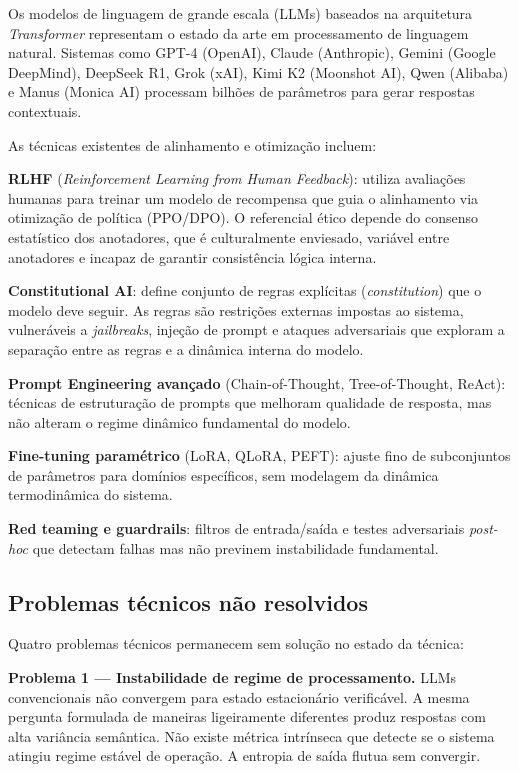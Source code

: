 \documentclass[12pt,a4paper]{article}
\begin{document}
Os modelos de linguagem de grande escala (LLMs) baseados na
arquitetura \textit{Transformer} representam o estado da arte em
processamento de linguagem natural. Sistemas como GPT-4 (OpenAI),
Claude (Anthropic), Gemini (Google DeepMind), DeepSeek R1, Grok
(xAI), Kimi K2 (Moonshot AI), Qwen (Alibaba) e Manus (Monica AI)
processam bilhões de parâmetros para gerar respostas contextuais.

As técnicas existentes de alinhamento e otimização incluem:

\textbf{RLHF} (\textit{Reinforcement Learning from Human Feedback}):
utiliza avaliações humanas para treinar um modelo de recompensa que
guia o alinhamento via otimização de política (PPO/DPO). O
referencial ético depende do consenso estatístico dos anotadores,
que é culturalmente enviesado, variável entre anotadores e incapaz
de garantir consistência lógica interna.

\textbf{Constitutional AI}: define conjunto de regras explícitas
(\textit{constitution}) que o modelo deve seguir. As regras são
restrições externas impostas ao sistema, vulneráveis a
\textit{jailbreaks}, injeção de prompt e ataques adversariais que
exploram a separação entre as regras e a dinâmica interna do modelo.

\textbf{Prompt Engineering avançado} (Chain-of-Thought,
Tree-of-Thought, ReAct): técnicas de estruturação de prompts que
melhoram qualidade de resposta, mas não alteram o regime dinâmico
fundamental do modelo.

\textbf{Fine-tuning paramétrico} (LoRA, QLoRA, PEFT): ajuste fino
de subconjuntos de parâmetros para domínios específicos, sem
modelagem da dinâmica termodinâmica do sistema.

\textbf{Red teaming e guardrails}: filtros de entrada/saída e
testes adversariais \textit{post-hoc} que detectam falhas mas não
previnem instabilidade fundamental.

\subsection{Problemas técnicos não resolvidos}

Quatro problemas técnicos permanecem sem solução no estado da
técnica:

\textbf{Problema 1 --- Instabilidade de regime de processamento.}
LLMs convencionais não convergem para estado estacionário
verificável. A mesma pergunta formulada de maneiras ligeiramente
diferentes produz respostas com alta variância semântica. Não
existe métrica intrínseca que detecte se o sistema atingiu regime
estável de operação. A entropia de saída flutua sem convergir.
\end{document}
